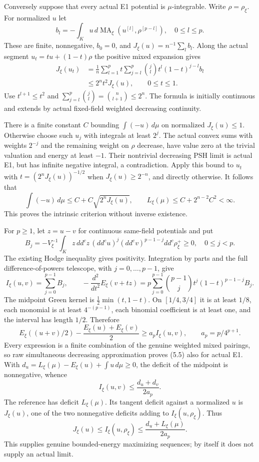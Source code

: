 \documentclass[
  10pt,
]{article}
\begin{document}
Conversely suppose that every actual E1 potential is \(\mu\)-integrable.
Write \(\rho=\rho_\xi\). For normalized \(u\) let \[
 b_l=-\int_Ku\,d\operatorname{MA}_\xi(u^{[l]},\rho^{[p-l]}),
 \quad 0\leq l\leq p.
\] These are finite, nonnegative, \(b_0=0\), and
\(J_\xi(u)=n^{-1}\sum_l b_l\). Along the actual segment
\(u_t=tu+(1-t)\rho\) the positive mixed expansion gives \[
 \begin{split}
 J_\xi(u_t)
 &=\frac1n\sum_{l=1}^p t\sum_{j=l}^p
                    \binom{j}{l}t^l(1-t)^{j-l}b_l\\
 &\leq 2^nt^2J_\xi(u),\qquad 0\leq t\leq1.
 \end{split}                                                   \tag{5.3}
\] Use \(t^{l+1}\leq t^2\) and
\(\sum_{j=l}^p\binom{j}{l}=\binom{n}{l+1}\leq2^n\). The formula is
initially continuous and extends by actual fixed-field weighted
decreasing continuity.

There is a finite constant \(C\) bounding \(\int(-u)\,d\mu\) on
normalized \(J_\xi(u)\leq1\). Otherwise choose such \(u_j\) with
integrals at least \(2^j\). The actual convex sums with weights
\(2^{-j}\) and the remaining weight on \(\rho\) decrease, have value
zero at the trivial valuation and energy at least \(-1\). Their
nontrivial decreasing PSH limit is actual E1, but has infinite negative
integral, a contradiction. Apply this bound to \(u_t\) with
\(t=(2^nJ_\xi(u))^{-1/2}\) when \(J_\xi(u)\geq2^{-n}\), and directly
otherwise. It follows that \[
 \int(-u)\,d\mu\leq C+C\sqrt{2^nJ_\xi(u)},\qquad
 L_\xi(\mu)\leq C+2^{n-2}C^2<\infty.                          \tag{5.4}
\] This proves the intrinsic criterion without inverse existence.

For \(p\geq1\), let \(z=u-v\) for continuous same-field potentials and
put \[
 B_j=-V_\xi^{-1}\int_K z\,dd^cz\,(dd^cu)^j(dd^cv)^{p-1-j}
                         dd^c\rho_\xi^+\geq0,\quad 0\leq j<p.
\] The existing Hodge inequality gives positivity. Integration by parts
and the full difference-of-powers telescope, with \(j=0,\ldots,p-1\),
give \[
 I_\xi(u,v)=\sum_{j=0}^{p-1}B_j,\qquad
 -\frac{d^2}{dt^2}E_\xi(v+tz)
   =p\sum_{j=0}^{p-1}\binom{p-1}{j}t^j(1-t)^{p-1-j}B_j.
\] The midpoint Green kernel is \(\tfrac12\min(t,1-t)\). On
\([1/4,3/4]\) it is at least \(1/8\), each monomial is at least
\(4^{-(p-1)}\), each binomial coefficient is at least one, and the
interval has length \(1/2\). Therefore \[
 E_\xi((u+v)/2)-\frac{E_\xi(u)+E_\xi(v)}2
               \geq a_pI_\xi(u,v),\qquad a_p=p/4^{p+1}.          \tag{5.5}
\] Every expression is a finite combination of the genuine weighted
mixed pairings, so raw simultaneous decreasing approximation proves
(5.5) also for actual E1. With
\(d_u=L_\xi(\mu)-E_\xi(u)+\int u\,d\mu\geq0\), the deficit of the
midpoint is nonnegative, whence \[
 I_\xi(u,v)\leq\frac{d_u+d_v}{2a_p}.                            \tag{5.6}
\] The reference has deficit \(L_\xi(\mu)\). Its tangent deficit against
a normalized \(u\) is \(J_\xi(u)\), one of the two nonnegative deficits
adding to \(I_\xi(u,\rho_\xi)\). Thus \[
 J_\xi(u)\leq I_\xi(u,\rho_\xi)
                \leq\frac{d_u+L_\xi(\mu)}{2a_p}.               \tag{5.7}
\] This supplies genuine bounded-energy maximizing sequences; by itself
it does not supply an actual limit.
\end{document}
